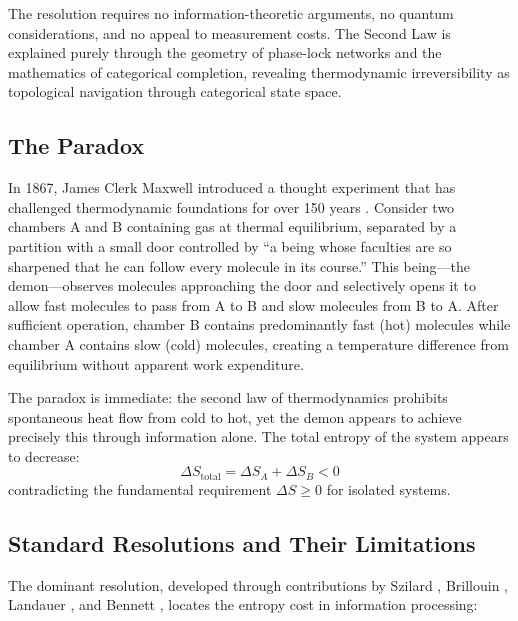 \documentclass[12pt,a4paper]{article}
\theoremstyle{definition}
\theoremstyle{remark}
\begin{document}
The resolution requires no information-theoretic arguments, no quantum considerations, and no appeal to measurement costs. The Second Law is explained purely through the geometry of phase-lock networks and the mathematics of categorical completion, revealing thermodynamic irreversibility as topological navigation through categorical state space.

\subsection{The Paradox}

In 1867, James Clerk Maxwell introduced a thought experiment that has challenged thermodynamic foundations for over 150 years \citep{maxwell1871theory}. Consider two chambers A and B containing gas at thermal equilibrium, separated by a partition with a small door controlled by ``a being whose faculties are so sharpened that he can follow every molecule in its course.'' This being---the demon---observes molecules approaching the door and selectively opens it to allow fast molecules to pass from A to B and slow molecules from B to A. After sufficient operation, chamber B contains predominantly fast (hot) molecules while chamber A contains slow (cold) molecules, creating a temperature difference from equilibrium without apparent work expenditure.

The paradox is immediate: the second law of thermodynamics prohibits spontaneous heat flow from cold to hot, yet the demon appears to achieve precisely this through information alone. The total entropy of the system appears to decrease:
\begin{equation}
\Delta S_{\text{total}} = \Delta S_A + \Delta S_B < 0
\label{eq:entropy_decrease}
\end{equation}
contradicting the fundamental requirement $\Delta S \geq 0$ for isolated systems.

\subsection{Standard Resolutions and Their Limitations}

The dominant resolution, developed through contributions by Szilard \citep{szilard1929entropieverminderung}, Brillouin \citep{brillouin1951maxwells}, Landauer \citep{landauer1961irreversibility}, and Bennett \citep{bennett1982thermodynamics}, locates the entropy cost in information processing:
\end{document}
